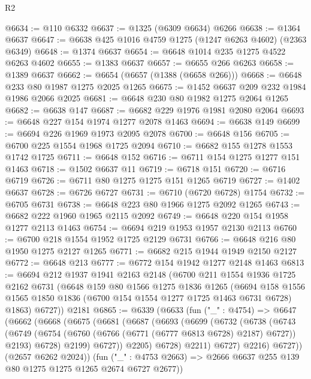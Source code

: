 \begin{lexlean}{R2}
\begin{coremodule}
@6634 := @110 @6332
@6637 := @1325 (@6309 @6634) @6266
@6638 := @1364 @6637
@6647 := @6638 @425 @1016 @4759 @1275 (@1247 @6263 @4602) (@2363 @6349)
@6648 := @1374 @6637
@6654 := @6648 @1014 @235 @1275 @4522 @6263 @4602
@6655 := @1383 @6637
@6657 := @6655 @266 @6263
@6658 := @1389 @6637
@6662 := @6654 (@6657 (@1388 (@6658 @266)))
@6668 := @6648 @233 @80 @1987 @1275 @2025 @1265
@6675 := @1452 @6637 @209 @232 @1984 @1986 @2066 @2025
@6681 := @6648 @230 @80 @1982 @1275 @2064 @1265
@6682 := @6638 @147
@6687 := @6682 @229 @1976 @1981 @2080 @2064
@6693 := @6648 @227 @154 @1974 @1277 @2078 @1463
@6694 := @6638 @149
@6699 := @6694 @226 @1969 @1973 @2095 @2078
@6700 := @6648 @156
@6705 := @6700 @225 @1554 @1968 @1725 @2094
@6710 := @6682 @155 @1278 @1553 @1742 @1725
@6711 := @6648 @152
@6716 := @6711 @154 @1275 @1277 @151 @1463
@6718 := @1502 @6637 @11
@6719 := @6718 @151
@6720 := @6716 @6719
@6726 := @6711 @80 @1275 @1275 @151 @1265 @6719
@6727 := @1402 @6637
@6728 := @6726 @6727
@6731 := @6710 (@6720 @6728) @1754
@6732 := @6705 @6731
@6738 := @6648 @223 @80 @1966 @1275 @2092 @1265
@6743 := @6682 @222 @1960 @1965 @2115 @2092
@6749 := @6648 @220 @154 @1958 @1277 @2113 @1463
@6754 := @6694 @219 @1953 @1957 @2130 @2113
@6760 := @6700 @218 @1554 @1952 @1725 @2129 @6731
@6766 := @6648 @216 @80 @1950 @1275 @2127 @1265
@6771 := @6682 @215 @1944 @1949 @2150 @2127
@6772 := @6648 @213
@6777 := @6772 @154 @1942 @1277 @2148 @1463
@6813 := @6694
    @212
    @1937
    @1941
    @2163
    @2148
    (@6700
      @211
      @1554
      @1936
      @1725
      @2162
      @6731
      (@6648
        @159
        @80
        @1566
        @1275
        @1836
        @1265
        (@6694 @158 @1556 @1565 @1850 @1836 (@6700 @154 @1554 @1277 @1725 @1463 @6731 @6728) @1863)
        @6727))
    @2181
@6865 := @6339
    (@6633
      (fun ("_" : @4754) =>
      @6647
        (@6662
          (@6668
            (@6675
              (@6681
                (@6687
                  (@6693
                    (@6699
                      (@6732
                        (@6738
                          (@6743
                            (@6749
                              (@6754 (@6760 (@6766 (@6771 (@6777 @6813 @6728) @2187) @6727)) @2193)
                              @6728)
                            @2199)
                          @6727))
                      @2205)
                    @6728)
                  @2211)
                @6727)
              @2216)
            @6727))
        (@2657 @6262 @2024))
      (fun ("_" : @4753 @2663) => @2666 @6637 @255 @139 @80 @1275 @1275 @1265 @2674 @6727 @2677))

\end{coremodule}
\end{lexlean}
